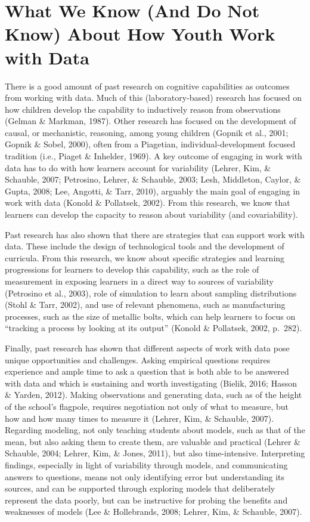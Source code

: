 \documentclass[]{msu-thesis}
\theoremstyle{definition}
\theoremstyle{definition}
\theoremstyle{definition}
\theoremstyle{remark}
\begin{document}
\section{What We Know (And Do Not Know) About How Youth Work with
Data}\label{what-we-know-and-do-not-know-about-how-youth-work-with-data}

There is a good amount of past research on cognitive capabilities as
outcomes from working with data. Much of this (laboratory-based)
research has focused on how children develop the capability to
inductively reason from observations (Gelman \& Markman, 1987). Other
research has focused on the development of causal, or mechanistic,
reasoning, among young children (Gopnik et al., 2001; Gopnik \& Sobel,
2000), often from a Piagetian, individual-development focused tradition
(i.e., Piaget \& Inhelder, 1969). A key outcome of engaging in work with
data has to do with how learners account for variability (Lehrer, Kim,
\& Schauble, 2007; Petrosino, Lehrer, \& Schauble, 2003; Lesh,
Middleton, Caylor, \& Gupta, 2008; Lee, Angotti, \& Tarr, 2010),
arguably the main goal of engaging in work with data (Konold \&
Pollatsek, 2002). From this research, we know that learners can develop
the capacity to reason about variability (and covariability).

Past research has also shown that there are strategies that can support
work with data. These include the design of technological tools and the
development of curricula. From this research, we know about specific
strategies and learning progressions for learners to develop this
capability, such as the role of measurement in exposing learners in a
direct way to sources of variability (Petrosino et al., 2003), role of
simulation to learn about sampling distributions (Stohl \& Tarr, 2002),
and use of relevant phenomena, such as manufacturing processes, such as
the size of metallic bolts, which can help learners to focus on
``tracking a process by looking at its output'' (Konold \& Pollatsek,
2002, p.~282).

Finally, past research has shown that different aspects of work with
data pose unique opportunities and challenges. Asking empirical
questions requires experience and ample time to ask a question that is
both able to be answered with data and which is sustaining and worth
investigating (Bielik, 2016; Hasson \& Yarden, 2012). Making
observations and generating data, such as of the height of the school's
flagpole, requires negotiation not only of what to measure, but how and
how many times to measure it (Lehrer, Kim, \& Schauble, 2007). Regarding
modeling, not only teaching students about models, such as that of the
mean, but also asking them to create them, are valuable and practical
(Lehrer \& Schauble, 2004; Lehrer, Kim, \& Jones, 2011), but also
time-intensive. Interpreting findings, especially in light of
variability through models, and communicating answers to questions,
means not only identifying error but understanding its sources, and can
be supported through exploring models that deliberately represent the
data poorly, but can be instructive for probing the benefits and
weaknesses of models (Lee \& Hollebrands, 2008; Lehrer, Kim, \&
Schauble, 2007).
\end{document}
